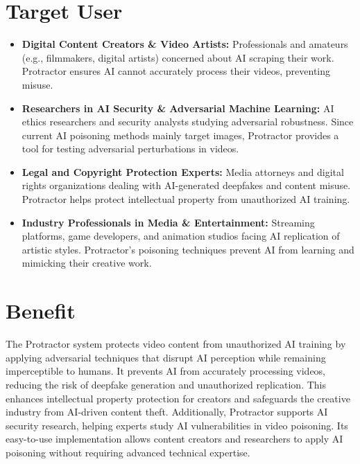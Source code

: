\section{Target User}
\label{section:target-user}

\begin{itemize}
    \item \textbf{Digital Content Creators \& Video Artists:} Professionals and amateurs (e.g., filmmakers, digital artists) concerned about AI scraping their work. Protractor ensures AI cannot accurately process their videos, preventing misuse.
    
    \item \textbf{Researchers in AI Security \& Adversarial Machine Learning:} AI ethics researchers and security analysts studying adversarial robustness. Since current AI poisoning methods mainly target images, Protractor provides a tool for testing adversarial perturbations in videos.
    
    \item \textbf{Legal and Copyright Protection Experts:} Media attorneys and digital rights organizations dealing with AI-generated deepfakes and content misuse. Protractor helps protect intellectual property from unauthorized AI training.
    
    \item \textbf{Industry Professionals in Media \& Entertainment:} Streaming platforms, game developers, and animation studios facing AI replication of artistic styles. Protractor’s poisoning techniques prevent AI from learning and mimicking their creative work.
\end{itemize}

\section{Benefit}
\label{section:benefit}

The Protractor system protects video content from unauthorized AI training by applying adversarial 
techniques that disrupt AI perception while remaining imperceptible to humans. It prevents AI from
 accurately processing videos, reducing the risk of deepfake generation and unauthorized replication. 
 This enhances intellectual property protection for creators and safeguards the creative industry 
 from AI-driven content theft. Additionally, Protractor supports AI security research, helping 
 experts study AI vulnerabilities in video poisoning. Its easy-to-use implementation allows content 
 creators and researchers to apply AI poisoning without requiring advanced technical expertise.

